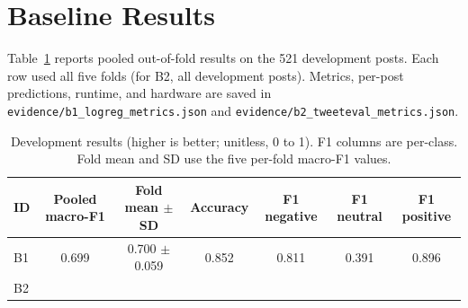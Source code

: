 \documentclass[sigconf,nonacm]{acmart}
\begin{document}
\section{Baseline Results}
\label{sec:results}
 
Table~\ref{tab:results} reports pooled out-of-fold results on the 521 development posts. Each row used all five folds (for B2, all development posts). Metrics, per-post predictions, runtime, and hardware are saved in \texttt{evidence/b1\_logreg\_metrics.json} and \texttt{evidence/b2\_tweeteval\_metrics.json}.
 
\begin{table}[t]
\caption{Development results (higher is better; unitless, 0 to 1). F1 columns are per-class. Fold mean and SD use the five per-fold macro-F1 values.}
\label{tab:results}
\begin{tabular}{lcccccc}
\toprule
ID & Pooled macro-F1 & Fold mean $\pm$ SD & Accuracy & F1 negative & F1 neutral & F1 positive \\
\midrule
B1 & 0.699 & 0.700 $\pm$ 0.059 & 0.852 & 0.811 & 0.391 & 0.896 \\
B2 & \tbd{} & \tbd{} & \tbd{} & \tbd{} & \tbd{} & \tbd{} \\
\bottomrule
\end{tabular}
\end{table}
\end{document}
